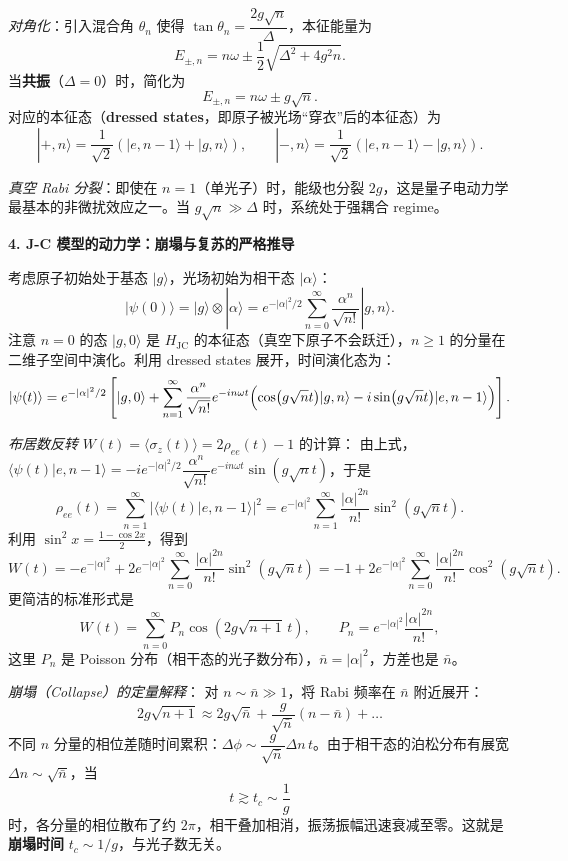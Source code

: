\textit{对角化}：引入混合角 $\theta_n$ 使得 $\tan\theta_n = \dfrac{2g\sqrt{n}}{\Delta}$，本征能量为
\[
E_{\pm,n} = n\omega \pm \frac{1}{2}\sqrt{\Delta^2 + 4g^2 n}.
\]
当\textbf{共振}（$\Delta=0$）时，简化为
\[
\boxed{E_{\pm,n} = n\omega \pm g\sqrt{n}}.
\]
对应的本征态（\textbf{dressed states}，即原子被光场``穿衣''后的本征态）为
\[
\boxed{|+,n\rangle = \frac{1}{\sqrt{2}}(|e,n-1\rangle + |g,n\rangle), \qquad
|-,n\rangle = \frac{1}{\sqrt{2}}(|e,n-1\rangle - |g,n\rangle)}.
\]

\textit{真空 Rabi 分裂}：即使在 $n=1$（单光子）时，能级也分裂 $2g$，这是量子电动力学最基本的非微扰效应之一。当 $g\sqrt{n} \gg \Delta$ 时，系统处于强耦合 regime。

\textbf{4. J-C 模型的动力学：崩塌与复苏的严格推导}

考虑原子初始处于基态 $|g\rangle$，光场初始为相干态 $|\alpha\rangle$：
\[
|\psi(0)\rangle = |g\rangle\otimes|\alpha\rangle = e^{-|\alpha|^2/2}\sum_{n=0}^\infty \frac{\alpha^n}{\sqrt{n!}} |g,n\rangle.
\]
注意 $n=0$ 的态 $|g,0\rangle$ 是 $H_{\text{JC}}$ 的本征态（真空下原子不会跃迁），$n\ge 1$ 的分量在二维子空间中演化。利用 dressed states 展开，时间演化态为：
\[
|\psi(t)\rangle = e^{-|\alpha|^2/2}\left[ |g,0\rangle + \sum_{n=1}^\infty \frac{\alpha^n}{\sqrt{n!}} e^{-in\omega t}
\Bigl( \cos(g\sqrt{n}t)|g,n\rangle - i\sin(g\sqrt{n}t)|e,n-1\rangle \Bigr) \right].
\]

\textit{布居数反转} $W(t) = \langle\sigma_z(t)\rangle = 2\rho_{ee}(t)-1$ 的计算：
由上式，$\langle\psi(t)|e,n-1\rangle = -ie^{-|\alpha|^2/2}\dfrac{\alpha^n}{\sqrt{n!}}e^{-in\omega t}\sin(g\sqrt{n}t)$，于是
\[
\rho_{ee}(t) = \sum_{n=1}^\infty |\langle\psi(t)|e,n-1\rangle|^2
= e^{-|\alpha|^2}\sum_{n=1}^\infty \frac{|\alpha|^{2n}}{n!}\sin^2(g\sqrt{n}t).
\]
利用 $\sin^2 x = \frac{1-\cos 2x}{2}$，得到
\[
\boxed{W(t) = -e^{-|\alpha|^2} + 2e^{-|\alpha|^2}\sum_{n=0}^\infty \frac{|\alpha|^{2n}}{n!}\sin^2(g\sqrt{n}t)
= -1 + 2e^{-|\alpha|^2}\sum_{n=0}^\infty \frac{|\alpha|^{2n}}{n!}\cos^2(g\sqrt{n}t)}.
\]
更简洁的标准形式是
\[
\boxed{W(t) = \sum_{n=0}^\infty P_n \cos(2g\sqrt{n+1}\,t)},
\qquad P_n = e^{-|\alpha|^2}\frac{|\alpha|^{2n}}{n!},
\]
这里 $P_n$ 是 Poisson 分布（相干态的光子数分布），$\bar{n}=|\alpha|^2$，方差也是 $\bar{n}$。

\textit{崩塌（Collapse）的定量解释}：
对 $n\sim\bar{n}\gg 1$，将 Rabi 频率在 $\bar{n}$ 附近展开：
\[
2g\sqrt{n+1} \approx 2g\sqrt{\bar{n}} + \frac{g}{\sqrt{\bar{n}}}(n-\bar{n}) + \dots
\]
不同 $n$ 分量的相位差随时间累积：$\Delta\phi \sim \dfrac{g}{\sqrt{\bar{n}}}\Delta n \, t$。由于相干态的泊松分布有展宽 $\Delta n \sim \sqrt{\bar{n}}$，当
\[
t \gtrsim t_c \sim \frac{1}{g}
\]
时，各分量的相位散布了约 $2\pi$，相干叠加相消，振荡振幅迅速衰减至零。这就是\textbf{崩塌时间} $t_c \sim 1/g$，与光子数无关。

